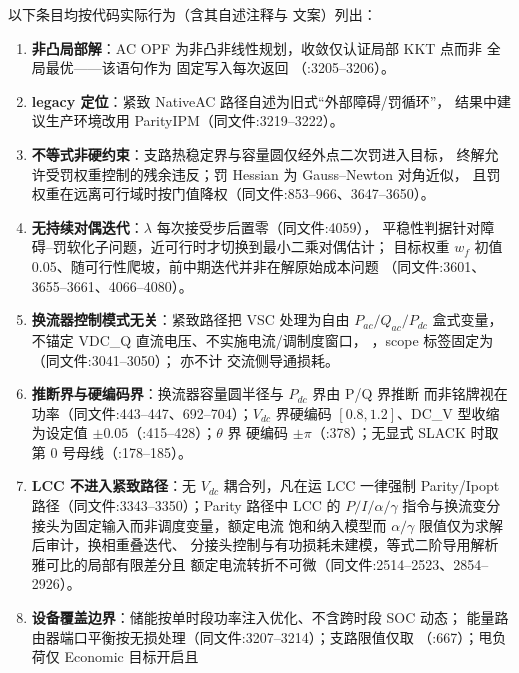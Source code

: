 以下条目均按代码实际行为（含其自述注释与  文案）列出：
\begin{enumerate}
  \item \textbf{非凸局部解}：AC OPF 为非凸非线性规划，收敛仅认证局部 KKT 点而非
        全局最优——该语句作为  固定写入每次返回
        （:3205--3206）。
  \item \textbf{legacy 定位}：紧致 NativeAC 路径自述为旧式``外部障碍/罚循环''，
        结果中建议生产环境改用 ParityIPM（同文件:3219--3222）。
  \item \textbf{不等式非硬约束}：支路热稳定界与容量圆仅经外点二次罚进入目标，
        终解允许受罚权重控制的残余违反；罚 Hessian 为 Gauss--Newton 对角近似，
        且罚权重在远离可行域时按门值降权（同文件:853--966、3647--3650）。
  \item \textbf{无持续对偶迭代}：$\lambda$ 每次接受步后置零（同文件:4059），
        平稳性判据针对障碍--罚软化子问题，近可行时才切换到最小二乘对偶估计；
        目标权重 $w_f$ 初值 0.05、随可行性爬坡，前中期迭代并非在解原始成本问题
        （同文件:3601、3655--3661、4066--4080）。
  \item \textbf{换流器控制模式无关}：紧致路径把 VSC 处理为自由 $P_{ac}/Q_{ac}/P_{dc}$
        盒式变量，不锚定 VDC\_Q 直流电压、不实施电流/调制度窗口，
        ，scope 标签固定为
        （同文件:3041--3050）；
        亦不计  交流侧导通损耗。
  \item \textbf{推断界与硬编码界}：换流器容量圆半径与 $P_{dc}$ 界由 P/Q 界推断
        而非铭牌视在功率（同文件:443--447、692--704）；$V_{dc}$ 界硬编码
        $[0.8,1.2]$、DC\_V 型收缩为设定值 $\pm0.05$（:415--428）；$\theta$ 界
        硬编码 $\pm\pi$（:378）；无显式 SLACK 时取第 0 号母线（:178--185）。
  \item \textbf{LCC 不进入紧致路径}：无 $V_{dc}$ 耦合列，凡在运 LCC 一律强制
        Parity/Ipopt 路径（同文件:3343--3350）；Parity 路径中 LCC 的
        $P/I/\alpha/\gamma$ 指令与换流变分接头为固定输入而非调度变量，额定电流
        饱和纳入模型而 $\alpha/\gamma$ 限值仅为求解后审计，换相重叠迭代、
        分接头控制与有功损耗未建模，等式二阶导用解析雅可比的局部有限差分且
        额定电流转折不可微（同文件:2514--2523、2854--2926）。
  \item \textbf{设备覆盖边界}：储能按单时段功率注入优化、不含跨时段 SOC 动态；
        能量路由器端口平衡按无损处理（同文件:3207--3214）；支路限值仅取
        （:667）；甩负荷仅 Economic 目标开启且 

\end{enumerate}
